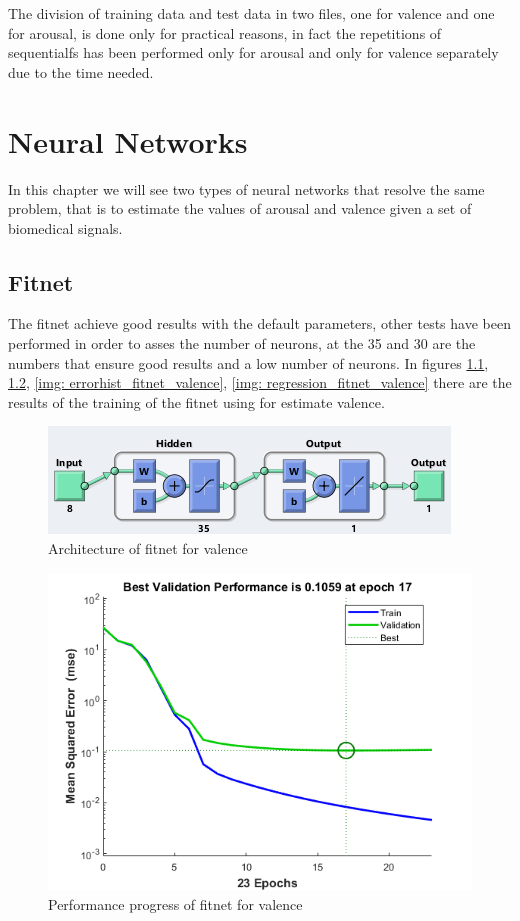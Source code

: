\documentclass[a4paper]{report}
\begin{document}
	\noindent The division of training data and test data in two files, one for valence and one for arousal, is done only for practical reasons, in fact the repetitions of sequentialfs has been performed only for arousal and only for valence separately due to the time needed.
	
\chapter{Neural Networks}
	\noindent In this chapter we will see two types of neural networks that resolve the same problem, that is to estimate the values of arousal and valence given a set of biomedical signals.	
	\section{Fitnet}
	\noindent The fitnet achieve good results with the default parameters, other tests have been performed in order to asses the number of neurons, at the 35 and 30 are the numbers that ensure good results and a low number of neurons.
	In figures \ref{img: fitnet_valence}, \ref{img: perf_fitnet_valence}, \ref{img: errorhist_fitnet_valence}, \ref{img: regression_fitnet_valence} there are the results of the training of the fitnet using for estimate valence.
		\begin{figure}[htbp]
		\centering
		\includegraphics[scale=0.8]{img/fitnet_valence.png}
		\caption{Architecture of fitnet for valence}
		\label{img: fitnet_valence}
	\end{figure}
	
		\begin{figure}[htbp]
		\centering
		\includegraphics[scale=0.8]{img/perf_fitnet_valence.png}
		\caption{Performance progress of fitnet for valence}
		\label{img: perf_fitnet_valence}
	\end{figure}
	
\end{document}
